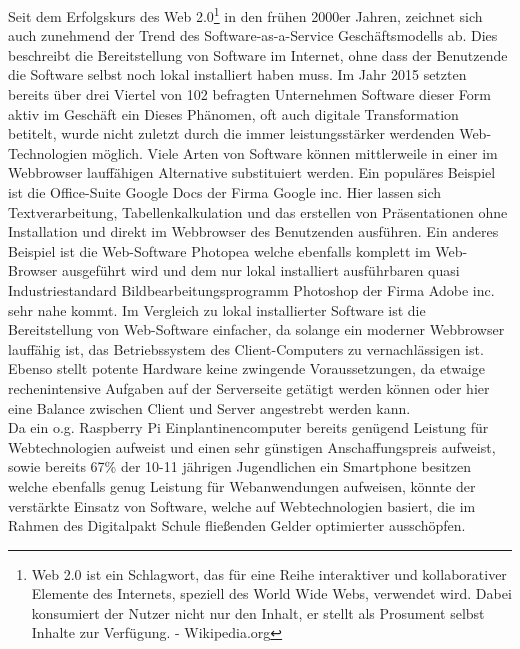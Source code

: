 Seit dem Erfolgskurs des Web 2.0\footnote{Web 2.0 ist ein Schlagwort, das für eine Reihe interaktiver und kollaborativer Elemente des Internets, speziell des World Wide Webs, verwendet wird. Dabei konsumiert der Nutzer nicht nur den Inhalt, er stellt als Prosument selbst Inhalte zur Verfügung. - Wikipedia.org} in den frühen 2000er Jahren, zeichnet sich auch zunehmend der Trend des Software-as-a-Service Geschäftsmodells ab. Dies beschreibt die Bereitstellung von Software im Internet, ohne dass der Benutzende die Software selbst noch lokal installiert haben muss. Im Jahr 2015 setzten bereits über drei Viertel von 102 befragten Unternehmen Software dieser Form aktiv im Geschäft ein\cite{TecArt-GmbH2019:online} Dieses Phänomen, oft auch digitale Transformation betitelt, wurde nicht zuletzt durch die immer leistungsstärker werdenden Web-Technologien möglich. Viele Arten von Software können  mittlerweile in einer im Webbrowser lauffähigen Alternative substituiert werden. Ein populäres Beispiel ist die Office-Suite Google Docs der Firma Google inc. Hier lassen sich Textverarbeitung, Tabellenkalkulation und das erstellen von Präsentationen ohne Installation und direkt im Webbrowser des Benutzenden ausführen. Ein anderes Beispiel ist die Web-Software Photopea welche ebenfalls komplett im Web-Browser ausgeführt wird und dem nur lokal installiert ausführbaren quasi Industriestandard Bildbearbeitungsprogramm Photoshop der Firma Adobe inc. sehr nahe kommt. Im Vergleich zu lokal installierter Software ist die Bereitstellung von Web-Software einfacher, da solange ein moderner Webbrowser lauffähig ist, das Betriebssystem des Client-Computers zu vernachlässigen ist. Ebenso stellt potente Hardware keine zwingende Voraussetzungen, da etwaige rechenintensive Aufgaben auf der Serverseite getätigt werden können oder hier eine Balance zwischen Client und Server angestrebt werden kann. \\ 

Da ein o.g. Raspberry Pi Einplantinencomputer bereits genügend Leistung für Webtechnologien aufweist und einen sehr günstigen Anschaffungspreis aufweist, sowie bereits 67\% der 10-11 jährigen Jugendlichen ein Smartphone besitzen\cite{Statista2017:online} welche ebenfalls genug Leistung für Webanwendungen aufweisen, könnte der verstärkte Einsatz von Software, welche auf Webtechnologien basiert, die im Rahmen des Digitalpakt Schule fließenden Gelder optimierter ausschöpfen. 

